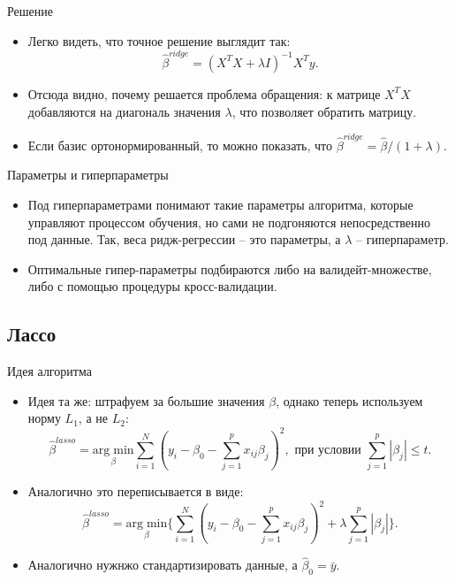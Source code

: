 \documentclass[9pt]{beamer}
\begin{document}
\begin{frame}{Решение}
\begin{itemize}
    \item Легко видеть, что точное решение выглядит так:
    $$\hat\beta^{ridge} = (X^TX + \lambda I)^{-1}X^Ty.$$
    \item Отсюда видно, почему решается проблема обращения: к матрице $X^TX$ добавляются на диагональ значения $\lambda$, что позволяет обратить матрицу.
    \item Если базис ортонормированный, то можно показать, что $\hat\beta^{ridge} = \hat\beta/(1+\lambda)$.
\end{itemize}
\end{frame}

\begin{frame}{Параметры и гиперпараметры}
    \begin{itemize}
        \item Под гиперпараметрами понимают такие параметры алгоритма, которые управляют процессом обучения, но сами не подгоняются непосредственно под данные. Так, веса ридж-регрессии -- это параметры, а $\lambda$ -- гиперпараметр.
        \item Оптимальные гипер-параметры подбираются либо на валидейт-множестве, либо с помощью процедуры кросс-валидации.
    \end{itemize}
\end{frame}

\subsection{Лассо}
\begin{frame}{Идея алгоритма}
    \begin{itemize}
        \item Идея та же: штрафуем за большие значения $\beta$, однако теперь используем норму $L_1$, а не $L_2$:
        $$\hat\beta^{lasso} = \underset{\beta}{\mathrm{arg\;min}} \sum_{i=1}^N \left(y_i -\beta_0 - \sum_{j=1}^p x_{ij}\beta_j\right)^2, \text{ при условии } \sum_{j=1}^p|\beta_j| \leq t.$$
        \item Аналогично это переписывается в виде:
        $$\hat\beta^{lasso} = \underset{\beta}{\mathrm{arg\;min}} \bigg\{ \sum_{i=1}^N \left(y_i -\beta_0 - \sum_{j=1}^p x_{ij}\beta_j\right)^2 + \lambda\sum_{j=1}^p|\beta_j| \bigg\}.$$
        \item Аналогично нужнжо стандартизировать данные, а $\hat \beta_0 = \bar y$.
    \end{itemize}
\end{frame}
\end{document}
